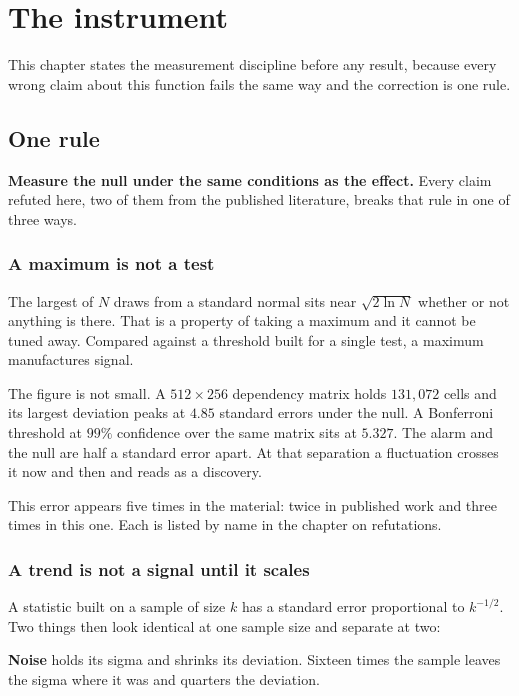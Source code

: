 \chapter{The instrument}

This chapter states the measurement discipline before any result, because every wrong claim about this function fails the same way and the correction is one rule.

\section{One rule}

\textbf{Measure the null under the same conditions as the effect.} Every claim refuted here, two of them from the published literature, breaks that rule in one of three ways.

\subsection{A maximum is not a test}

The largest of \(N\) draws from a standard normal sits near \(\sqrt{2 \ln N}\) whether or not anything is there. That is a property of taking a maximum and it cannot be tuned away. Compared against a threshold built for a single test, a maximum manufactures signal.

The figure is not small. A \(512 \times 256\) dependency matrix holds \(131{,}072\) cells and its largest deviation peaks at \(4.85\) standard errors under the null. A Bonferroni threshold at \(99\%\) confidence over the same matrix sits at \(5.327\). The alarm and the null are half a standard error apart. At that separation a fluctuation crosses it now and then and reads as a discovery.

This error appears five times in the material: twice in published work and three times in this one. Each is listed by name in the chapter on refutations.

\subsection{A trend is not a signal until it scales}

A statistic built on a sample of size \(k\) has a standard error proportional to \(k^{-1/2}\). Two things then look identical at one sample size and separate at two:

\textbf{Noise} holds its sigma and shrinks its deviation. Sixteen times the sample leaves the sigma where it was and quarters the deviation.

